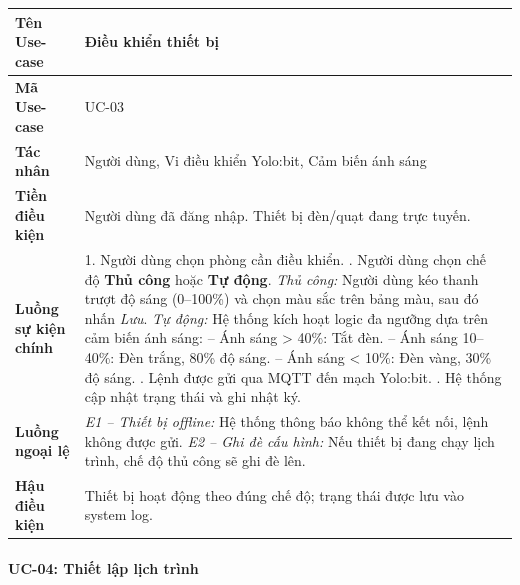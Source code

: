 \begin{table}[H]
\centering
\renewcommand{\arraystretch}{1.4}
\begin{tabular}{|p{3.8cm}|p{10cm}|}
\hline
\textbf{Tên Use-case}       & Điều khiển thiết bị \\ \hline
\textbf{Mã Use-case}        & UC-03 \\ \hline
\textbf{Tác nhân}           & Người dùng, Vi điều khiển Yolo:bit, Cảm biến ánh sáng \\ \hline
\textbf{Tiền điều kiện}     & Người dùng đã đăng nhập. Thiết bị đèn/quạt đang trực tuyến. \\ \hline
\textbf{Luồng sự kiện chính} & 
1. Người dùng chọn phòng cần điều khiển. \newline
2. Người dùng chọn chế độ \textbf{Thủ công} hoặc \textbf{Tự động}. \newline
\quad \textit{Thủ công:} Người dùng kéo thanh trượt độ sáng (0--100\%) và chọn màu sắc trên bảng màu, sau đó nhấn \textit{Lưu}. \newline
\quad \textit{Tự động:} Hệ thống kích hoạt logic đa ngưỡng dựa trên cảm biến ánh sáng: \newline
\qquad -- Ánh sáng > 40\%: Tắt đèn. \newline
\qquad -- Ánh sáng 10--40\%: Đèn trắng, 80\% độ sáng. \newline
\qquad -- Ánh sáng < 10\%: Đèn vàng, 30\% độ sáng. \newline
3. Lệnh được gửi qua MQTT đến mạch Yolo:bit. \newline
4. Hệ thống cập nhật trạng thái và ghi nhật ký. \\ \hline
\textbf{Luồng ngoại lệ}     & 
\textit{E1 -- Thiết bị offline:} Hệ thống thông báo không thể kết nối, lệnh không được gửi. \newline
\textit{E2 -- Ghi đè cấu hình:} Nếu thiết bị đang chạy lịch trình, chế độ thủ công sẽ ghi đè lên. \\ \hline
\textbf{Hậu điều kiện}      & Thiết bị hoạt động theo đúng chế độ; trạng thái được lưu vào system log. \\ \hline
\end{tabular}
\end{table}

\paragraph{UC-04: Thiết lập lịch trình}

